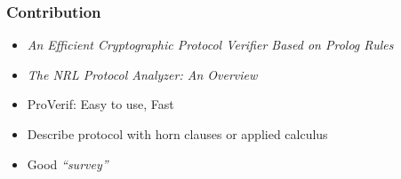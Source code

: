 \documentclass[10pt]{beamer}
\begin{document}
\begin{frame}
  \frametitle{Contribution}
  \begin{itemize}
  \item \textit{An Efficient Cryptographic Protocol Verifier Based on Prolog Rules}
  \item \textit{The NRL Protocol Analyzer: An Overview}
  \item ProVerif: Easy to use, Fast
  \item Describe protocol with horn clauses or applied calculus
  \item Good \textit{``survey''}
  \end{itemize}
\end{frame}


{\aauwavesbg
\begin{frame}
\end{frame}}
\end{document}
